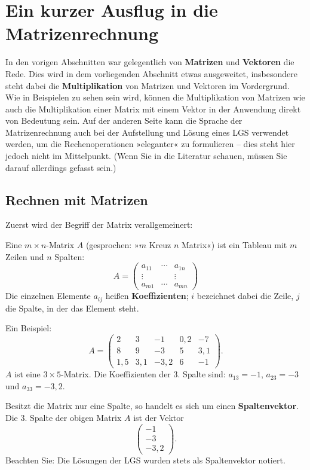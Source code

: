\section{Ein kurzer Ausflug in die Matrizenrechnung}

In den vorigen Abschnitten war gelegentlich von \textbf{Matrizen} und \textbf{Vektoren} die Rede. Dies wird in dem vorliegenden Abschnitt etwas ausgeweitet, insbesondere steht dabei die \textbf{Multiplikation} von Matrizen und Vektoren im Vordergrund. Wie in Beispielen zu sehen sein wird, können die Multiplikation von Matrizen wie auch die Multiplikation einer Matrix mit einem Vektor in der Anwendung direkt von Bedeutung sein. Auf der anderen Seite kann die Sprache der Matrizenrechnung auch bei der Aufstellung und Lösung eines LGS verwendet werden, um die Rechenoperationen »eleganter« zu formulieren -- dies steht hier jedoch nicht im Mittelpunkt. (Wenn Sie in die Literatur schauen, müssen Sie darauf allerdings gefasst sein.)

\subsection{Rechnen mit Matrizen}

Zuerst wird der Begriff der Matrix verallgemeinert:

Eine $m \times n$-Matrix $A$ (gesprochen: »$m$ Kreuz $n$ Matrix«) ist ein Tableau mit $m$ Zeilen und $n$ Spalten:
\[ A = \begin{pmatrix} a_{11} & \cdots & a_{1n} \\ \vdots & & \vdots \\ a_{m1} & \cdots & a_{mn} \end{pmatrix} \]
Die einzelnen Elemente $a_{ij}$ heißen \textbf{Koeffizienten}; $i$ bezeichnet dabei die Zeile, $j$ die Spalte, in der das Element steht.

Ein Beispiel:
\[ A = \begin{pmatrix} 2 & 3 & -1 & 0{,}2 & -7 \\ 8 & 9 & -3 & 5 & 3{,}1 \\ 1{,}5 & 3{,}1 & -3{,}2 & 6 & -1 \end{pmatrix} . \]
$A$ ist eine $3 \times 5$-Matrix. Die Koeffizienten der 3. Spalte sind: $a_{13} = -1$, $a_{23} = -3$ und $a_{33} = -3{,}2$.

Besitzt die Matrix nur eine Spalte, so handelt es sich um einen \textbf{Spaltenvektor}. Die 3. Spalte der obigen Matrix $A$ ist der Vektor
\[ \begin{pmatrix} -1 \\ -3 \\ -3{,}2 \end{pmatrix} . \]
Beachten Sie: Die Lösungen der LGS wurden stets als Spaltenvektor notiert.

